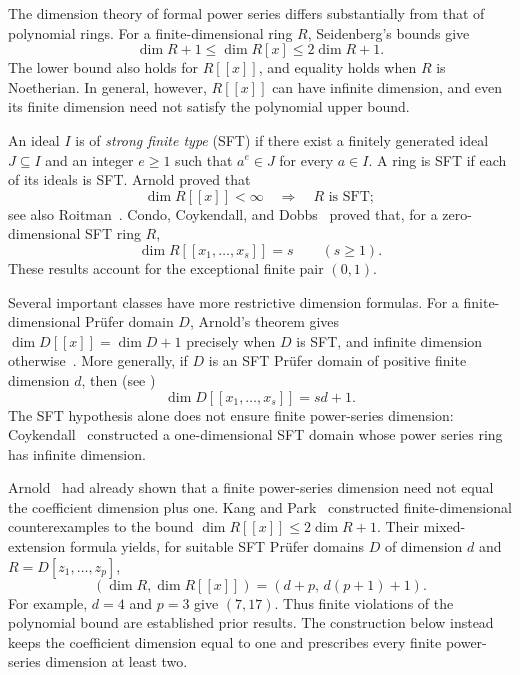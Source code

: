 \documentclass[11pt,reqno]{amsart}
\numberwithin{equation}{section}
\theoremstyle{plain}
\theoremstyle{definition}
\theoremstyle{remark}
\begin{document}
The dimension theory of formal power series differs substantially
from that of polynomial rings. For a finite-dimensional ring $R$,
Seidenberg's bounds \cite{Seidenberg1953} give
\[
 \dim R+1\le\dim R[x]\le2\dim R+1.
\]
The lower bound also holds for $R[[x]]$, and equality holds when $R$
is Noetherian. In general, however, $R[[x]]$ can have infinite
dimension, and even its finite dimension need not satisfy the
polynomial upper bound.

An ideal $I$ is of \emph{strong finite type} (SFT) if there exist a
finitely generated ideal $J\subseteq I$ and an integer $e\ge1$ such
that $a^e\in J$ for every $a\in I$. A ring is SFT if each of its
ideals is SFT. Arnold \cite{Arnold1973a} proved that
\begin{equation}\label{eq:arnold}
 \dim R[[x]]<\infty\quad\Longrightarrow\quad R\text{ is SFT};
\end{equation}
see also Roitman~\cite{Roitman2015}. Condo, Coykendall, and
Dobbs~\cite[Corollary~2.2]{CondoCoykendallDobbs1996} proved that,
for a zero-dimensional SFT ring $R$,
\begin{equation}\label{eq:zero-classical}
 \dim R[[x_1,\ldots,x_s]]=s\qquad(s\ge1).
\end{equation}
These results account for the exceptional finite pair $(0,1)$.

Several important classes have more restrictive dimension formulas.
For a finite-dimensional Pr\"ufer domain $D$, Arnold's theorem
gives $\dim D[[x]]=\dim D+1$ precisely when $D$ is SFT, and
infinite dimension otherwise~\cite[Theorem~3.8]{Arnold1973b}.
More generally, if $D$ is an SFT Pr\"ufer domain of positive finite
dimension $d$, then (see \cite[Theorem~3.6]{Arnold1982})
\[
 \dim D[[x_1,\ldots,x_s]]=sd+1.
\]
The SFT hypothesis alone does not ensure finite power-series
dimension: Coykendall~\cite{Coykendall2002} constructed a
one-dimensional SFT domain whose power series ring has infinite
dimension.

Arnold~\cite{Arnold1981} had already shown that a finite
power-series dimension need not equal the coefficient dimension
plus one. Kang and Park~\cite{KangPark2009} constructed finite-dimensional
counterexamples to the bound $\dim R[[x]]\le2\dim R+1$.
Their mixed-extension formula yields, for suitable SFT Pr\"ufer
domains $D$ of dimension $d$ and $R=D[z_1,\ldots,z_p]$,
\[
 (\dim R,\dim R[[x]])=(d+p,\,d(p+1)+1).
\]
For example, $d=4$ and $p=3$ give $(7,17)$.
Thus finite violations of the polynomial bound are established
prior results. The construction below instead keeps the coefficient
dimension equal to one and prescribes every finite power-series
dimension at least two.
\end{document}
